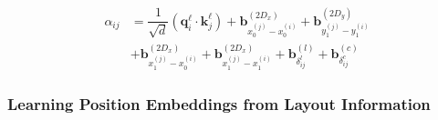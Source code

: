 \begin{equation}
  \begin{split}
  \alpha_{ij} &= \dfrac{1}{\sqrt{d}} \left(\bm{q}^{\ell}_i \cdot \bm{k}^{\ell}_j\right)
              + \bm{b}^{(2D_x)}_{x^{(j)}_{0} - x^{(i)}_{0}} + \bm{b}^{(2D_y)}_{y^{(j)}_{1} - y^{(i)}_{1}} \\
              & + \bm{b}^{(2D_x)}_{x^{(j)}_{1} - x^{(i)}_{0}} + \bm{b}^{(2D_x)}_{x^{(j)}_{1} - x^{(i)}_{1}} 
               + \bm{b}^{(l)}_{\delta^{l}_{ij}}  + \bm{b}^{(c)}_{\delta^{c}_{ij}}
  \end{split}
\label{eq:layout2pos-attention}
\end{equation}



\subsubsection{Learning Position Embeddings from Layout Information}

